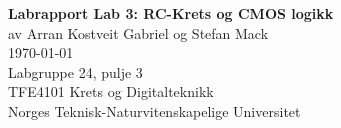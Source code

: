 \documentclass[12pt, a4paper]{article}
\begin{document}
\begin{titlepage}
    \begin{center}
        \vspace*{1.5cm}
        {\Huge\textbf{Labrapport Lab 3: RC-Krets og CMOS logikk}}\\
        \vspace{1cm}
        {\Large av Arran Kostveit Gabriel og Stefan Mack}\\
        \vspace{1cm}
        \today\\ %
        \vspace{1cm}
        Labgruppe 24, pulje 3\\
        
        \vfill
        {
            \large TFE4101 Krets og Digitalteknikk\\ 
            Norges Teknisk-Naturvitenskapelige Universitet
        }
        
        
        
    \end{center}
\end{titlepage}


\clearpage

\clearpage
\end{document}
